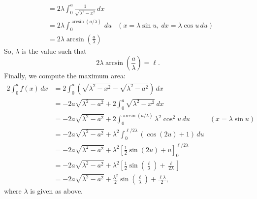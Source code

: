 \documentclass[10pt,letterpaper]{report}
\begin{document}
\begin{enumerate}
\begin{align*}
    &= 2\lambda \int_0^a \frac{1}{\sqrt{\lambda^2 - x^2}}\,dx \\
    &= 2\lambda \int_0^{\arcsin(a/\lambda)}\,du &(x = \lambda \sin u,\ dx = \lambda\cos u\,du) \\
    &= 2\lambda\arcsin\left(\frac{a}{\lambda}\right)
\end{align*}
So, $\lambda$ is the value such that
\[
2\lambda\arcsin\left(\frac{a}{\lambda}\right) = \ell.
\]
Finally, we compute the maximum area:
\begin{align*}
    2\int_0^a f(x)\,dx 
    &= 
    2\int_0^a \left(\sqrt{\lambda^2 - x^2}- \sqrt{\lambda^2 - a^2}\right)\,dx \\
    &=
    -2a\sqrt{\lambda^2 - a^2} + 2\int_0^a\sqrt{\lambda^2 - x^2}\,dx \\
    &= -2a\sqrt{\lambda^2 - a^2} + 2\int_0^{\arcsin(a/\lambda)}\lambda^2\cos^2 u \,du &(x = \lambda \sin u) \\
    &= -2a\sqrt{\lambda^2 - a^2} + \lambda^2\int_0^{\ell/2\lambda}(\cos(2u) + 1) \,du
    \\
    &= -2a\sqrt{\lambda^2 - a^2} + \lambda^2\left[\frac{1}{2}\sin(2u) + u\right]_0^{\ell/2\lambda}
    \\
    &= -2a\sqrt{\lambda^2 - a^2} + \lambda^2\left[\frac{1}{2}\sin\left(\frac{\ell}{\lambda}\right) + \frac{\ell}{2\lambda}\right]
    \\
    &= -2a\sqrt{\lambda^2 - a^2} + \frac{\lambda^2}{2}\sin\left(\frac{\ell}{\lambda}\right) + \frac{\ell\lambda}{2},
\end{align*}
where $\lambda$ is given as above.


\end{enumerate}
\end{document}
